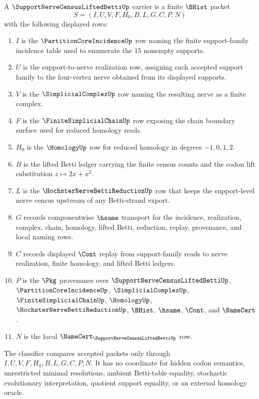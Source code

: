 \begin{definition}
\label{def:support-nerve-census-lifted-betti-carrier}
A $\SupportNerveCensusLiftedBettiUp$ carrier is a finite $\BHist$ packet
$$
S=(I,U,V,F,H_0,B,L,G,C,P,N)
$$
with the following displayed rows:
\begin{enumerate}
\item $I$ is the $\PartitionCoreIncidenceUp$ row naming the finite support-family incidence table used to enumerate the $15$ nonempty supports.
\item $U$ is the support-to-nerve realization row, assigning each accepted support family to the four-vertex nerve obtained from its displayed supports.
\item $V$ is the $\SimplicialComplexUp$ row naming the resulting nerve as a finite complex.
\item $F$ is the $\FiniteSimplicialChainUp$ row exposing the chain boundary surface used for reduced homology reads.
\item $H_0$ is the $\HomologyUp$ row for reduced homology in degrees $-1,0,1,2$.
\item $B$ is the lifted Betti ledger carrying the finite census counts and the codon lift substitution $z\mapsto 2x+x^2$.
\item $L$ is the $\HochsterNerveBettiReductionUp$ row that keeps the support-level nerve census upstream of any Betti-strand export.
\item $G$ records componentwise $\hsame$ transport for the incidence, realization, complex, chain, homology, lifted Betti, reduction, replay, provenance, and local naming rows.
\item $C$ records displayed $\Cont$ replay from support-family reads to nerve realization, finite homology, and lifted Betti ledgers.
\item $P$ is the $\Pkg$ provenance over $\SupportNerveCensusLiftedBettiUp$, $\PartitionCoreIncidenceUp$, $\SimplicialComplexUp$, $\FiniteSimplicialChainUp$, $\HomologyUp$, $\HochsterNerveBettiReductionUp$, $\BHist$, $\hsame$, $\Cont$, and $\NameCert$.
\item $N$ is the local $\NameCert_{\SupportNerveCensusLiftedBettiUp}$ row.
\end{enumerate}
The classifier compares accepted packets only through $I,U,V,F,H_0,B,L,G,C,P,N$. It has no coordinate for hidden codon semantics, unrestricted minimal resolutions, ambient Betti-table equality, stochastic evolutionary interpretation, quotient support equality, or an external homology oracle.
\end{definition}

